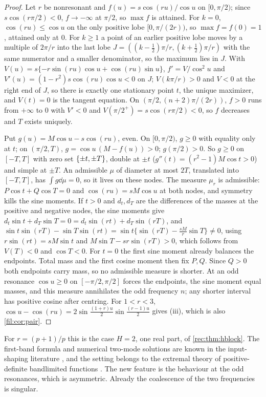 \begin{proof}
Let $r$ be nonresonant and $f(u)=s\cos(ru)/\cos u$ on $[0,\pi/2)$; since $s\cos(r\pi/2)<0$, $f\to-\infty$ at
$\pi/2$, so $\max f$ is attained. For $k=0$, $\cos(ru)\le\cos u$ on the only positive lobe $[0,\pi/(2r))$, so
$\max f=f(0)=1$, attained only at $0$. For $k\ge1$ a point of an earlier positive lobe moves by a multiple
of $2\pi/r$ into the last lobe $J=((k-\tfrac12)\pi/r,(k+\tfrac12)\pi/r)$ with the same numerator and a smaller
denominator, so the maximum lies in $J$. With $V(u)=s\{-r\sin(ru)\cos u+\cos(ru)\sin u\}$, $f'=V/\cos^2u$ and
$V'(u)=(1-r^2)s\cos(ru)\cos u<0$ on $J$; $V(k\pi/r)>0$ and $V<0$ at the right end of $J$, so there is exactly one
stationary point $t$, the unique maximizer, and $V(t)=0$ is the tangent equation. On
$(\pi/2,(n+2)\pi/(2r))$, $f>0$ runs from $+\infty$ to $0$ with $V'<0$ and $V(\pi/2^+)=s\cos(r\pi/2)<0$, so $f$ decreases
and $T$ exists uniquely.

Put $g(u)=M\cos u-s\cos(ru)$, even. On $[0,\pi/2)$, $g\ge0$ with equality only at $t$; on $(\pi/2,T)$,
$g=\cos u\,(M-f(u))>0$; $g(\pi/2)>0$. So $g\ge0$ on $[-T,T]$ with zero set $\{\pm t,\pm T\}$, double at $\pm t$
($g''(t)=(r^2-1)M\cos t>0$) and simple at $\pm T$. An admissible $\mu$ of diameter at most $2T$, translated into
$[-T,T]$, has $\int g\dd\mu=0$, so it lives on these nodes. The measure $\mu_r$ is admissible:
$P\cos t+Q\cos T=0$ and $\cos(ru)=sM\cos u$ at both nodes, and symmetry kills the sine moments. If
$t>0$ and $d_t,d_T$ are the differences of the masses at the positive and negative nodes, the sine
moments give $d_t\sin t+d_T\sin T=0=d_t\sin(rt)+d_T\sin(rT)$, and
$\sin t\sin(rT)-\sin T\sin(rt)=\sin t\{\sin(rT)-\tfrac{sM}r\sin T\}\ne0$, using $r\sin(rt)=sM\sin t$ and
$M\sin T-sr\sin(rT)>0$, which follows from $V(T)<0$ and $\cos T<0$. For $t=0$ the first sine moment
already balances the endpoints. Total mass and the first cosine moment then fix $P,Q$. Since $Q>0$
both endpoints carry mass, so no admissible measure is shorter. At an odd resonance $\cos u\ge0$ on
$[-\pi/2,\pi/2]$ forces the endpoints, the sine moment equal masses, and this measure annihilates the
odd frequency $n$; any shorter interval has positive cosine after centring. For $1<r<3$,
$\cos u-\cos(ru)=2\sin\frac{(1+r)u}2\sin\frac{(r-1)u}2$ gives (iii), which is also \cref{fil:cor:pair}.
\end{proof}

For $r=(p+1)/p$ this is the case $H=2$, one real part, of \cref{rec:thm:hblock}. The first-band formula and numerical two-mode solutions are known in the
input-shaping literature
\cite{CrainSinghoseSeering1996Derivation,SinghoseCrainSeering1997Convolved,Convolve1995Minimizing}, and the
setting belongs to the extremal theory of positive-definite bandlimited functions \cite{Logan1983Extremal}.
The new feature is the behaviour at the odd resonances, which is asymmetric. Already the coalescence of the
two frequencies is singular.

